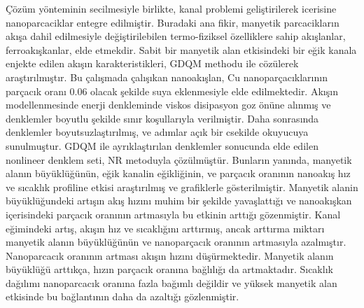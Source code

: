 \c{C}\"{o}z\"{u}m y\"{o}nteminin secilmesiyle birlikte, kanal problemi geli\c{s}tirilerek icerisine nanoparcaciklar entegre edilmi\c{s}tir. Buradaki ana fikir, manyetik parcaciklar{\i}n ak{\i}\c{s}a dahil edilmesiyle de\u{g}i\c{s}tirilebilen termo-fiziksel \"{o}zelliklere sahip ak{\i}\c{s}lanlar, ferroak{\i}\c{s}kanlar, elde etmekdir. Sabit bir manyetik alan etkisindeki bir e\u{g}ik kanala enjekte edilen ak{\i}\c{s}{\i}n karakteristikleri, GDQM methodu ile c\"{o}z\"{u}lerek ara\c{s}t{\i}r{\i}lm{\i}\c{s}t{\i}r. Bu \c{c}al{\i}\c{s}mada \c{c}al{\i}\c{s}{\i}kan nanoak{\i}\c{s}lan, Cu nanopar\c{c}ac{\i}klar{\i}n{\i}n par\c{c}ac{\i}k oran{\i} 0.06 olacak \c{s}ekilde suya eklenmesiyle elde edilmektedir. Ak{\i}\c{s}{\i}n modellenmesinde enerji denkleminde viskos disipasyon goz \"{o}n\"{u}ne al{\i}nm{\i}\c{s} ve denklemler boyutlu \c{s}ekilde s{\i}n{\i}r ko\c{s}ullar{\i}yla verilmi\c{s}tir. Daha sonras{\i}nda denklemler boyutsuzla\c{s}t{\i}r{\i}lm{\i}\c{s}, ve ad{\i}mlar a\c{c}{\i}k bir c{s}ekilde okuyucuya sunulmu\c{s}tur.  GDQM ile ayr{\i}kla\c{s}t{\i}r{\i}lan denklemler sonucunda elde edilen nonlineer denklem seti, NR metoduyla \c{c}\"{o}z\"{u}lm\"{u}\c{s}t\"{u}r. Bunlar{\i}n yan{\i}nda, manyetik alan{\i}n b\"{u}y\"{u}kl\"{u}\u{g}\"{u}n\"{u}n, e\u{g}ik kanalin e\u{g}ikli\u{g}inin, ve par\c{c}ac{\i}k oran{\i}n{\i}n nanoak{\i}\c{s} h{\i}z ve s{\i}cakl{\i}k profiline etkisi ara\c{s}t{\i}r{\i}lm{\i}\c{s} ve grafiklerle g\"{o}sterilmi\c{s}tir. Manyetik alanin b\"{u}y\"{u}kl\"{u}\u{g}undeki art{\i}\c{s}{\i}n ak{\i}\c{s} h{\i}z{\i}n{\i} muhim bir \c{s}ekilde yava\c{s}latt{\i}\u{g}{\i} ve nanoak{\i}\c{s}kan i\c{c}erisindeki par\c{c}ac{\i}k oran{\i}n{\i}n artmas{\i}yla bu etkinin artt{\i}\u{g}{\i} g\"{o}zenmi\c{s}tir. Kanal e\u{g}imindeki art{\i}\c{s}, ak{\i}\c{s}{\i}n h{\i}z ve s{\i}cakl{\i}\u{g}{\i}n{\i} artt{\i}rm{\i}\c{s}, ancak artt{\i}rma miktar{\i} manyetik alan{\i}n b\"{u}y\"{u}kl\"{u}\u{g}\"{u}n\"{u}n ve nanopar\c{c}ac{\i}k oran{\i}n{\i}n artmas{\i}yla azalm{\i}\c{s}t{\i}r. Nanoparcac{\i}k oran{\i}n{\i}n artmas{\i} ak{\i}\c{s}{\i}n h{\i}z{\i}n{\i} d\"{u}\c{s}\"{u}rmektedir. Manyetik alan{\i}n b\"{u}y\"{u}kl\"{u}\u{g}\"{u} artt{\i}k\c{c}a, h{\i}z{\i}n par\c{c}ac{\i}k oran{\i}na ba\u{g}l{\i}l{\i}\u{g}{\i} da artmaktad{\i}r. S{\i}cakl{\i}k da\u{g}{\i}l{\i}m{\i} nanoparcac{\i}k oran{\i}na fazla ba\u{g}{\i}ml{\i} de\u{g}ildir ve y\"{u}ksek manyetik alan etkisinde bu ba\u{g}lant{\i}n{\i}n daha da azalt{\i}\u{g}{\i} g\"{o}zlenmi\c{s}tir. 

